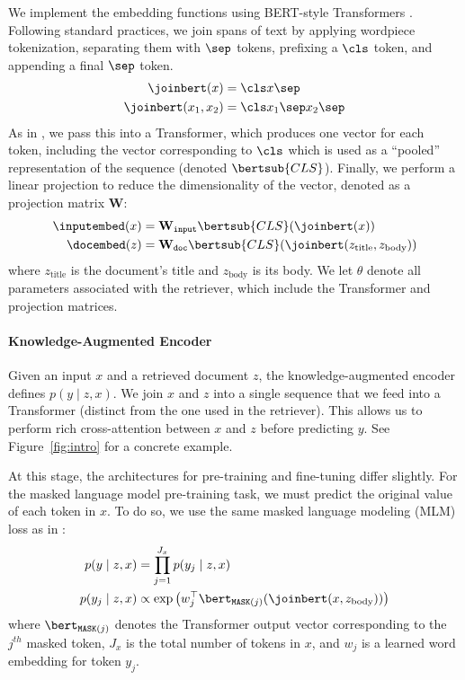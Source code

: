 We implement the embedding functions using BERT-style Transformers \cite{bert}. Following standard practices, we join spans of text by applying wordpiece tokenization, separating them with $\sep$ tokens, prefixing a $\cls$ token, and appending a final $\sep$ token.
\begin{align*}
    \joinbert(x) & = \cls x \sep \\
    \joinbert(x_1, x_2) & = \cls x_1 \sep x_2 \sep
\end{align*}
As in \citet{bert}, we pass this into a Transformer, which produces one vector for each token, including the vector corresponding to $\cls$ which is used as a ``pooled'' representation of the sequence (denoted $\bertsub{CLS}$). Finally, we perform a linear projection to reduce the dimensionality of the vector, denoted as a projection matrix $\mathbf{W}$:%
\begin{align*}
\inputembed(x) & = \mathbf{W_\mathtt{input}}\bertsub{CLS}(\joinbert(x)) \\
\docembed(z) & = \mathbf{W_\mathtt{doc}}\bertsub{CLS}(\joinbert(z_\text{title}, z_\text{body}))
\end{align*}
where $z_\text{title}$ is the document's title and $z_\text{body}$ is its body.
We let $\theta$ denote all parameters associated with the retriever, which include the Transformer and projection matrices.

\paragraph{Knowledge-Augmented Encoder}
Given an input $x$ and a retrieved document $z$, the knowledge-augmented encoder defines $p(y\mid z,x)$. We join $x$ and $z$ into a single sequence that we feed into a Transformer (distinct from the one used in the retriever). This allows us to perform rich cross-attention between $x$ and $z$ before predicting $y$. See Figure~\ref{fig:intro} for a concrete example.

At this stage, the architectures for pre-training and fine-tuning differ slightly. For the masked language model pre-training task, we must predict the original value of each \mask token in $x$. To do so, we use the same masked language modeling (MLM) loss as in \citet{bert}:
\begin{align*}
\centering
p(y\mid z,x) &= \prod_{j=1}^{J_x} p(y_j \mid z, x) \\
p(y_j \mid z, x) &\propto \exp \left(w_j^\top \bert_{\mathtt{MASK}(j)}(\joinbert(x, z_\text{body}))\right)
\end{align*}
where $\bert_{\mathtt{MASK}(j)}$ denotes the Transformer output vector corresponding to the $j^{th}$ masked token, $J_x$ is the total number of \mask tokens in $x$, and $w_j$ is a learned word embedding for token $y_j$.


